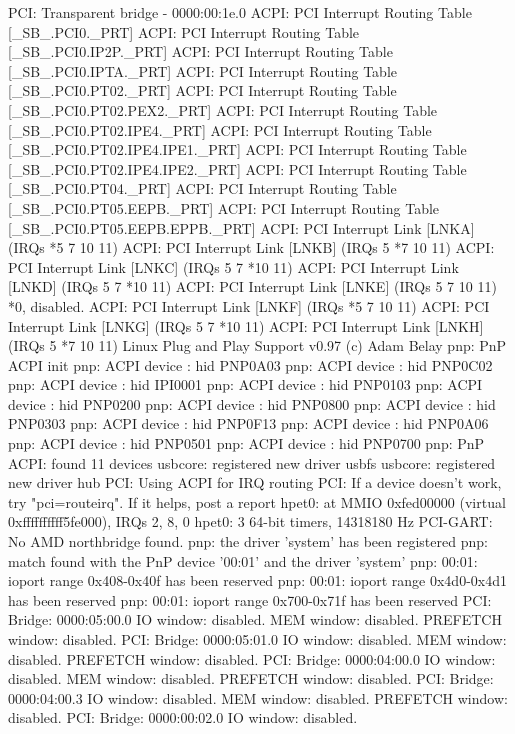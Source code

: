 \documentclass[mingoth,a4paper]{jsarticle}
\begin{document}
{{{{{{{{\begin{commandline}
PCI: Transparent bridge - 0000:00:1e.0
ACPI: PCI Interrupt Routing Table [\_SB_.PCI0._PRT]
ACPI: PCI Interrupt Routing Table [\_SB_.PCI0.IP2P._PRT]
ACPI: PCI Interrupt Routing Table [\_SB_.PCI0.IPTA._PRT]
ACPI: PCI Interrupt Routing Table [\_SB_.PCI0.PT02._PRT]
ACPI: PCI Interrupt Routing Table [\_SB_.PCI0.PT02.PEX2._PRT]
ACPI: PCI Interrupt Routing Table [\_SB_.PCI0.PT02.IPE4._PRT]
ACPI: PCI Interrupt Routing Table [\_SB_.PCI0.PT02.IPE4.IPE1._PRT]
ACPI: PCI Interrupt Routing Table [\_SB_.PCI0.PT02.IPE4.IPE2._PRT]
ACPI: PCI Interrupt Routing Table [\_SB_.PCI0.PT04._PRT]
ACPI: PCI Interrupt Routing Table [\_SB_.PCI0.PT05.EEPB._PRT]
ACPI: PCI Interrupt Routing Table [\_SB_.PCI0.PT05.EEPB.EPPB._PRT]
ACPI: PCI Interrupt Link [LNKA] (IRQs *5 7 10 11)
ACPI: PCI Interrupt Link [LNKB] (IRQs 5 *7 10 11)
ACPI: PCI Interrupt Link [LNKC] (IRQs 5 7 *10 11)
ACPI: PCI Interrupt Link [LNKD] (IRQs 5 7 *10 11)
ACPI: PCI Interrupt Link [LNKE] (IRQs 5 7 10 11) *0, disabled.
ACPI: PCI Interrupt Link [LNKF] (IRQs *5 7 10 11)
ACPI: PCI Interrupt Link [LNKG] (IRQs 5 7 *10 11)
ACPI: PCI Interrupt Link [LNKH] (IRQs 5 *7 10 11)
Linux Plug and Play Support v0.97 (c) Adam Belay
pnp: PnP ACPI init
pnp: ACPI device : hid PNP0A03
pnp: ACPI device : hid PNP0C02
pnp: ACPI device : hid IPI0001
pnp: ACPI device : hid PNP0103
pnp: ACPI device : hid PNP0200
pnp: ACPI device : hid PNP0800
pnp: ACPI device : hid PNP0303
pnp: ACPI device : hid PNP0F13
pnp: ACPI device : hid PNP0A06
pnp: ACPI device : hid PNP0501
pnp: ACPI device : hid PNP0700
pnp: PnP ACPI: found 11 devices
usbcore: registered new driver usbfs
usbcore: registered new driver hub
PCI: Using ACPI for IRQ routing
PCI: If a device doesn't work, try "pci=routeirq".  If it helps, post a report
hpet0: at MMIO 0xfed00000 (virtual 0xffffffffff5fe000), IRQs 2, 8, 0
hpet0: 3 64-bit timers, 14318180 Hz
PCI-GART: No AMD northbridge found.
pnp: the driver 'system' has been registered
pnp: match found with the PnP device '00:01' and the driver 'system'
pnp: 00:01: ioport range 0x408-0x40f has been reserved
pnp: 00:01: ioport range 0x4d0-0x4d1 has been reserved
pnp: 00:01: ioport range 0x700-0x71f has been reserved
PCI: Bridge: 0000:05:00.0
  IO window: disabled.
  MEM window: disabled.
  PREFETCH window: disabled.
PCI: Bridge: 0000:05:01.0
  IO window: disabled.
  MEM window: disabled.
  PREFETCH window: disabled.
PCI: Bridge: 0000:04:00.0
  IO window: disabled.
  MEM window: disabled.
  PREFETCH window: disabled.
PCI: Bridge: 0000:04:00.3
  IO window: disabled.
  MEM window: disabled.
  PREFETCH window: disabled.
PCI: Bridge: 0000:00:02.0
  IO window: disabled.

\end{commandline}}}}}}}}}
\end{document}
